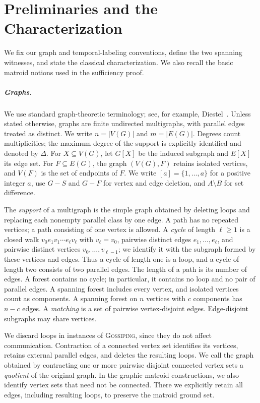 \documentclass[USenglish, a4paper, thm-restate,numberwithinsect, cleveref]{lipics-v2021}
\newcommand{\Gossip}{\textnormal{\textsc{Gossiping}}\xspace}
\begin{document}
\section{Preliminaries and the Characterization}
\label{sec:preliminaries}
We fix our graph and temporal-labeling conventions, define the two
spanning witnesses, and state the classical characterization. We also
recall the basic matroid notions used in the sufficiency proof.

\subparagraph*{Graphs.}
We use standard graph-theoretic terminology; see, for example,
Diestel~\cite{Die16}. Unless stated otherwise, graphs are finite
undirected multigraphs, with parallel edges treated as distinct. We
write $n=|V(G)|$ and $m=|E(G)|$. Degrees count multiplicities; the
maximum degree of the support is explicitly identified and denoted
by $\Delta$. For $X\subseteq V(G)$, let $G[X]$ be the induced subgraph
and $E[X]$ its edge set. For $F\subseteq E(G)$, the graph $(V(G),F)$
retains isolated vertices, and $V(F)$ is the set of endpoints of $F$.
We write $[a]=\{1,\ldots,a\}$ for a positive integer $a$, use $G-S$
and $G-F$ for vertex and edge deletion, and $A\setminus B$ for set difference.

The \emph{support} of a multigraph is the simple graph obtained by
deleting loops and replacing each nonempty parallel class by one
edge. A path has no repeated vertices; a path consisting of one vertex
is allowed. A \emph{cycle} of length $\ell\geq1$ is a closed walk
$v_0e_1v_1\cdots e_\ell v_\ell$ with $v_\ell=v_0$, pairwise distinct
edges $e_1,\ldots,e_\ell$, and pairwise distinct vertices
$v_0,\ldots,v_{\ell-1}$; we identify it with the subgraph formed by
these vertices and edges. Thus a cycle of length one is a loop, and a
cycle of length two consists of two parallel edges. The length of a
path is its number of edges.
A forest contains no cycle; in particular, it contains no loop and no
pair of parallel edges.
A spanning forest includes every vertex, and isolated vertices count
as components. A spanning forest on $n$ vertices with $c$ components
has $n-c$ edges. A \emph{matching} is a set of pairwise vertex-disjoint edges.
Edge-disjoint subgraphs may share vertices.

We discard loops in instances of \Gossip, since they do not
affect communication. Contraction of a connected vertex set identifies
its vertices, retains external parallel edges, and deletes the resulting
loops. We call the graph obtained by contracting one or more pairwise
disjoint connected vertex sets a \emph{quotient} of the original graph.
In the graphic matroid constructions, we also identify vertex sets that
need not be connected. There we explicitly retain all edges, including
resulting loops, to preserve the matroid ground set.
\end{document}
